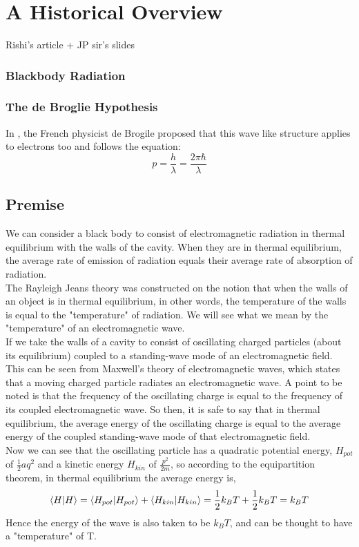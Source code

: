 \chapter{A Historical Overview}
Rishi's article + JP sir's slides
\subsection{Blackbody Radiation}
\subsection{The de Broglie Hypothesis}
In , the French physicist de Brogile proposed that this wave like structure applies to electrons too and follows the equation:
\begin{equation}
	p = \frac{h}{\lambda} = \frac{2 \pi \hbar}{ \lambda}
\end{equation}

\section{Premise}
We can consider a black body to consist of electromagnetic radiation in thermal equilibrium with the walls of the cavity. When they are in thermal equilibrium, the average rate of emission of radiation equals their average rate of absorption of radiation. \\

\noindent The Rayleigh Jeans theory was constructed on the notion that when the walls of an object is in thermal equilibrium, in other words, the temperature of the walls is equal to the "temperature" of radiation. We will see what we mean by the "temperature" of an electromagnetic wave. \\

\noindent If we take the walls of a cavity to consist of oscillating charged particles (about its equilibrium) coupled to a standing-wave mode of an electromagnetic field. This can be seen from Maxwell's theory of electromagnetic waves, which states that a moving charged particle radiates an electromagnetic wave. A point to be noted is that the frequency of the oscillating charge is equal to the frequency of its coupled electromagnetic wave. So then, it is safe to say that in thermal equilibrium, the average energy of the oscillating charge is equal to the average energy of the coupled standing-wave mode of that electromagnetic field. \\

\noindent Now we can see that the oscillating particle has a quadratic potential energy, $H_{pot}$  of $\frac{1}{2}aq^2$ and a kinetic energy $H_{kin}$ of $\frac{p^2}{2m}$, so according to the equipartition theorem, in thermal equilibrium the average energy is,
\begin{equation}
	\braket{H}=\braket{H_{pot}}+\braket{H_{kin}}=\frac{1}{2}k_BT+\frac{1}{2}k_BT=k_BT
\end{equation}	
Hence the energy of the wave is also taken to be $k_BT$, and can be thought to have a "temperature" of T. \\

